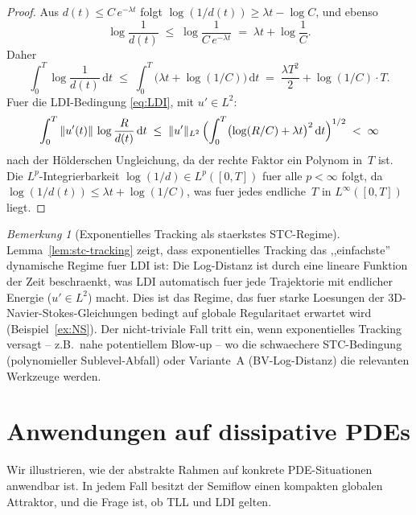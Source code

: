 \documentclass[12pt,a4paper]{article}
\theoremstyle{definition}
\theoremstyle{plain}
\theoremstyle{remark}
\newtheorem{remark}[definition]{Bemerkung}
\begin{document}
\begin{proof}
Aus $d(t) \le C\,e^{-\lambda t}$ folgt
$\log(1/d(t)) \ge \lambda t - \log C$, und ebenso
\[
  \log\frac{1}{d(t)}
  \;\le\;
  \log\frac{1}{C\,e^{-\lambda t}}
  \;=\;
  \lambda t + \log\frac{1}{C}.
\]
Daher
\[
  \int_0^T \log\frac{1}{d(t)}\,\mathrm{d}t
  \;\le\;
  \int_0^T \bigl(\lambda t + \log(1/C)\bigr)\,\mathrm{d}t
  \;=\;
  \frac{\lambda T^2}{2} + \log(1/C)\cdot T.
\]
Fuer die LDI-Bedingung \eqref{eq:LDI}, mit $u' \in L^2$:
\[
  \int_0^T \|u'(t)\|\,\log\frac{R}{d(t)}\,\mathrm{d}t
  \;\le\;
  \|u'\|_{L^2}\,
  \Bigl(\int_0^T \bigl(\log(R/C) + \lambda t\bigr)^2\,\mathrm{d}t
  \Bigr)^{1/2}
  \;<\; \infty
\]
nach der H\"olderschen Ungleichung, da der rechte Faktor ein
Polynom in~$T$ ist. Die $L^p$-Integrierbarkeit
$\log(1/d) \in L^p([0,T])$ fuer alle $p < \infty$ folgt, da
$\log(1/d(t)) \le \lambda t + \log(1/C)$, was fuer jedes
endliche~$T$ in $L^\infty([0,T])$ liegt.
\end{proof}

\begin{remark}[Exponentielles Tracking als staerkstes STC-Regime]
\label{rem:exp-tracking-strongest}
Lemma~\ref{lem:stc-tracking} zeigt, dass exponentielles Tracking
das ,,einfachste'' dynamische Regime fuer LDI ist: Die Log-Distanz
ist durch eine lineare Funktion der Zeit beschraenkt, was LDI
automatisch fuer jede Trajektorie mit endlicher Energie
($u' \in L^2$) macht. Dies ist das Regime, das fuer starke
Loesungen der 3D-Navier-Stokes-Gleichungen bedingt auf globale
Regularitaet erwartet wird (Beispiel~\ref{ex:NS}). Der
nicht-triviale Fall tritt ein, wenn exponentielles Tracking
versagt -- z.B.\ nahe potentiellem Blow-up -- wo die
schwaechere STC-Bedingung (polynomieller Sublevel-Abfall) oder
Variante~A (BV-Log-Distanz) die relevanten Werkzeuge werden.
\end{remark}


\section{Anwendungen auf dissipative PDEs}
\label{sec:applications}

Wir illustrieren, wie der abstrakte Rahmen auf konkrete
PDE-Situationen anwendbar ist.  In jedem Fall besitzt der Semiflow
einen kompakten globalen Attraktor, und die Frage ist, ob TLL und
LDI gelten.

\end{document}
